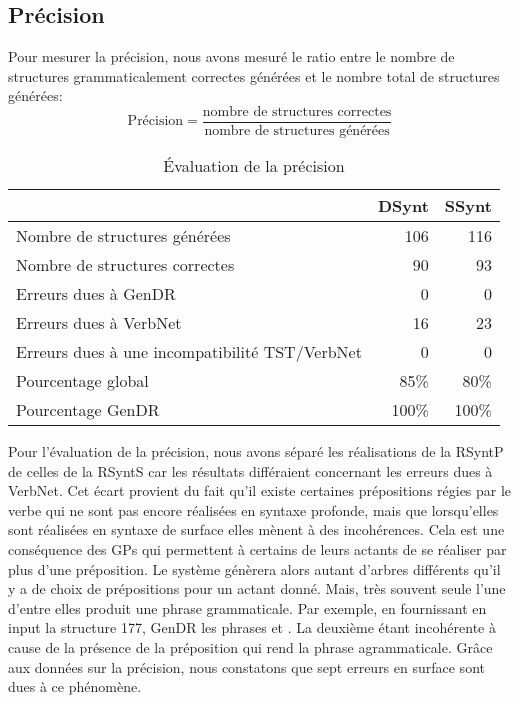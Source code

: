 \subsection{Précision}
Pour mesurer la précision, nous avons mesuré le ratio entre le nombre de structures grammaticalement correctes générées et le nombre total de structures générées:
\[\text{Précision} = \frac{\text{nombre de structures correctes}}{\text{nombre de structures générées}}\]

\begin{table}
\caption{Évaluation de la précision}
\begin{tabular}{lrr}
 \toprule
  & DSynt & SSynt\\
 \midrule
 Nombre de structures générées   & 106  & 116 \\
 Nombre de structures correctes  &  90  & 93   \\
 Erreurs dues à GenDR & 0 & 0\\
 Erreurs dues à VerbNet    & 16 & 23\\
 Erreurs dues à une incompatibilité TST/VerbNet & 0 & 0\\
 \midrule
 Pourcentage global & 85\%  & 80\% \\
 Pourcentage GenDR & 100\%  & 100\% \\
 \bottomrule
\end{tabular}
\end{table}

Pour l'évaluation de la précision, nous avons séparé les réalisations de la \ac{RSyntP} de celles de la \ac{RSyntS} car les résultats différaient concernant les erreurs dues à VerbNet. Cet écart provient du fait qu'il existe certaines prépositions régies par le verbe qui ne sont pas encore réalisées en syntaxe profonde, mais que lorsqu'elles sont réalisées en syntaxe de surface elles mènent à des incohérences. Cela est une conséquence des \acp{GP} qui permettent à certains de leurs actants de se réaliser par plus d'une préposition. Le système génèrera alors autant d'arbres différents qu'il y a de choix de prépositions pour un actant donné. Mais, très souvent seule l'une d'entre elles produit une phrase grammaticale. Par exemple, en fournissant en input la structure 177, GenDR les phrases  et \ungr{}. La deuxième étant incohérente à cause de la présence de la préposition  qui rend la phrase agrammaticale. Grâce aux données sur la précision, nous constatons que sept erreurs en surface sont dues à ce phénomène.


